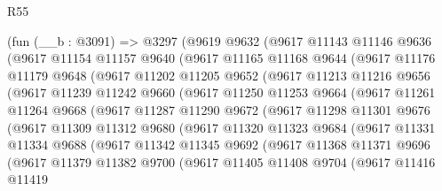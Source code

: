\begin{lexlean}{R55}
\begin{coremodule}
    (fun (__b : @3091) =>
    @3297
      (@9619
        @9632
        (@9617
          @11143
          @11146
          @9636
          (@9617
            @11154
            @11157
            @9640
            (@9617
              @11165
              @11168
              @9644
              (@9617
                @11176
                @11179
                @9648
                (@9617
                  @11202
                  @11205
                  @9652
                  (@9617
                    @11213
                    @11216
                    @9656
                    (@9617
                      @11239
                      @11242
                      @9660
                      (@9617
                        @11250
                        @11253
                        @9664
                        (@9617
                          @11261
                          @11264
                          @9668
                          (@9617
                            @11287
                            @11290
                            @9672
                            (@9617
                              @11298
                              @11301
                              @9676
                              (@9617
                                @11309
                                @11312
                                @9680
                                (@9617
                                  @11320
                                  @11323
                                  @9684
                                  (@9617
                                    @11331
                                    @11334
                                    @9688
                                    (@9617
                                      @11342
                                      @11345
                                      @9692
                                      (@9617
                                        @11368
                                        @11371
                                        @9696
                                        (@9617
                                          @11379
                                          @11382
                                          @9700
                                          (@9617
                                            @11405
                                            @11408
                                            @9704
                                            (@9617
                                              @11416
                                              @11419

\end{coremodule}
\end{lexlean}
